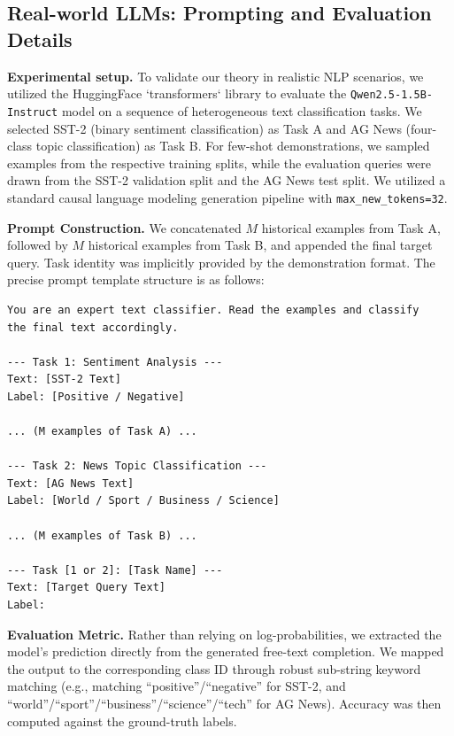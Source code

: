 \documentclass{article}
\theoremstyle{plain}
\theoremstyle{definition}
\theoremstyle{remark}
\begin{document}
\subsection{Real-world LLMs: Prompting and Evaluation Details}
\label{app:realworld_details}
\noindent \textbf{Experimental setup.}
To validate our theory in realistic NLP scenarios, we utilized the HuggingFace `transformers` library to evaluate the \texttt{Qwen2.5-1.5B-Instruct} model on a sequence of heterogeneous text classification tasks. We selected SST-2 (binary sentiment classification) as Task A and AG News (four-class topic classification) as Task B. For few-shot demonstrations, we sampled examples from the respective training splits, while the evaluation queries were drawn from the SST-2 validation split and the AG News test split. We utilized a standard causal language modeling generation pipeline with \texttt{max\_new\_tokens=32}.

\noindent \textbf{Prompt Construction.}
We concatenated $M$ historical examples from Task A, followed by $M$ historical examples from Task B, and appended the final target query. Task identity was implicitly provided by the demonstration format. The precise prompt template structure is as follows:

\begin{tcolorbox}[colback=gray!5!white, colframe=gray!75!black, title=Prompt Template for ICCL Evaluation, arc=2mm]
\small
\begin{verbatim}
You are an expert text classifier. Read the examples and classify 
the final text accordingly.

--- Task 1: Sentiment Analysis ---
Text: [SST-2 Text]
Label: [Positive / Negative]

... (M examples of Task A) ...

--- Task 2: News Topic Classification ---
Text: [AG News Text]
Label: [World / Sport / Business / Science]

... (M examples of Task B) ...

--- Task [1 or 2]: [Task Name] ---
Text: [Target Query Text]
Label:
\end{verbatim}
\end{tcolorbox}

\noindent \textbf{Evaluation Metric.}
Rather than relying on log-probabilities, we extracted the model's prediction directly from the generated free-text completion. We mapped the output to the corresponding class ID through robust sub-string keyword matching (e.g., matching ``positive''/``negative'' for SST-2, and ``world''/``sport''/``business''/``science''/``tech'' for AG News). Accuracy was then computed against the ground-truth labels.


 
\end{document}
